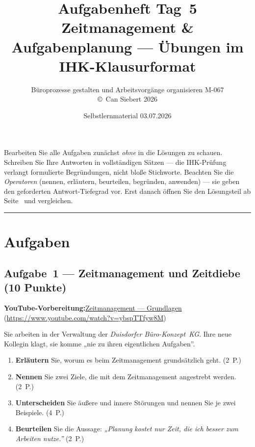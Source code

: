 \documentclass[11pt, a4paper]{article}
\title{\vspace*{-1.5cm}\Huge\bfseries\color{bfwPrimaryDark}Aufgabenheft Tag~5\\[0.4em]
  \large\color{bfwInkSoft}\textnormal{Zeitmanagement \& Aufgabenplanung --- Übungen im IHK-Klausurformat}}
\author{\textsf{Büroprozesse gestalten und Arbeitsvorgänge organisieren \textperiodcentered{} M-067}\\
\textsf{\small\copyright\ Can Siebert\,\textperiodcentered\,2026}}
\date{Selbstlernmaterial \textperiodcentered{} 03.07.2026}
\begin{document}
\maketitle
\thispagestyle{empty}

\begin{merksatz}[title={\bfseries So nutzen Sie dieses Aufgabenheft}]
Bearbeiten Sie alle Aufgaben zunächst \emph{ohne} in die Lösungen zu schauen. Schreiben
Sie Ihre Antworten in vollständigen Sätzen --- die IHK-Prüfung verlangt formulierte
Begründungen, nicht bloße Stichworte. Beachten Sie die \emph{Operatoren} (nennen,
erläutern, beurteilen, begründen, anwenden) --- sie geben den geforderten Antwort-Tiefegrad
vor. Erst danach öffnen Sie den Lösungsteil ab Seite~\pageref{loesungen} und vergleichen.
\end{merksatz}

\tableofcontents
\vspace{1em}
\hrule

\section{Aufgaben}

\subsection*{Aufgabe~1 --- Zeitmanagement und Zeitdiebe (10 Punkte)}

\noindent\textbf{\color{bfwAccent}YouTube-Vorbereitung:}\enspace \href{https://www.youtube.com/watch?v=ybspTTfyw8M}{Zeitmanagement --- Grundlagen} (\url{https://www.youtube.com/watch?v=ybspTTfyw8M})

\medskip
Sie arbeiten in der Verwaltung der \emph{Duisdorfer Büro-Konzept~KG}. Ihre neue Kollegin
klagt, sie komme „nie zu ihren eigentlichen Aufgaben”.

\begin{enumerate}[label=(\alph*)]
  \item \textbf{Erläutern} Sie, worum es beim Zeitmanagement grundsätzlich geht. \hfill (2~P.)
  \item \textbf{Nennen} Sie zwei Ziele, die mit dem Zeitmanagement angestrebt werden. \hfill (2~P.)
  \item \textbf{Unterscheiden} Sie äußere und innere Störungen und nennen Sie je zwei Beispiele. \hfill (4~P.)
  \item \textbf{Beurteilen} Sie die Aussage: \emph{„Planung kostet nur Zeit, die ich besser zum Arbeiten nutze.”} \hfill (2~P.)
\end{enumerate}
\end{document}
